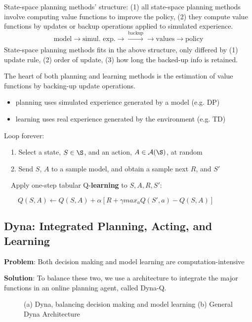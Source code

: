 \documentclass[sutton_barto_notes.tex]{subfiles}
\begin{document}
State-space planning methods' structure: (1) all state-space planning methods involve computing value functions to improve the policy, (2) they compute value functions by updates or backup operations applied to simulated experience.
$$ \text{model} \rightarrow \text{simul. exp.} \rightarrow \xrightarrow[]{\text{backup}} \rightarrow \text{values} \rightarrow \text{policy} $$
State-space planning methods fits in the above structure, only differed by (1) update rule, (2) order of update, (3) how long the backed-up info is retained.

The heart of both planning and learning methods is the estimation of value functions by backing-up update operations.
\begin{itemize}
\item planning uses simulated experience generated by a model (e.g. DP)
\item learning uses real experience generated by the environment (e.g. TD)
\end{itemize}


\begin{tcolorbox}[width=1.1\textwidth,title={Random-sample one-step tabular Q-\textbf{planning}}]
Loop forever:

$\quad$1. Select a state, $S \in \S$, and an action, $A \in \A(\S)$, at random

$\quad$2. Send $S$, $A$ to a sample model, and obtain a sample next $R$, and $S'$

$\quad$Apply one-step tabular Q-\textbf{learning} to $S,A,R,S'$:

$\quad\quad Q(S,A)\leftarrow Q(S,A) + \alpha [R + \gamma max_a Q(S',a) - Q(S,A)]$
\end{tcolorbox}


\subsection{Dyna: Integrated Planning, Acting, and Learning}

\textbf{Problem}: Both decision making and model learning are computation-intensive

\textbf{Solution}: To balance these two, we use a architecture to integrate the major functions in an online planning agent, called Dyna-Q.

\begin{figure}[!h]
    \centering
    \caption{ (a) Dyna, balancing decision making and model learning (b) General Dyna Architecture }
    \label{fig:dyna}
\end{figure}
\end{document}
